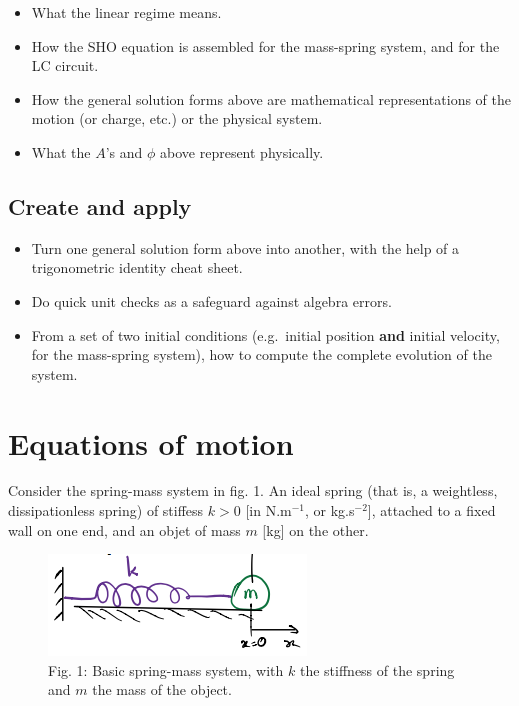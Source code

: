 \documentclass[11pt]{article}
\makeatletter
\def\maxwidth{\ifdim\Gin@nat@width>\linewidth\linewidth
    \else\Gin@nat@width\fi}
\let\Oldincludegraphics\includegraphics
\renewcommand{\includegraphics}[1]{\Oldincludegraphics[width=.8\maxwidth]{#1}}
\providecommand{\tightlist}{%
      \setlength{\itemsep}{0pt}\setlength{\parskip}{0pt}}
\makeatother
\begin{document}
\begin{itemize}
\tightlist
\item
  What the linear regime means.
\item
  How the SHO equation is assembled for the mass-spring system, and for
  the LC circuit.
\item
  How the general solution forms above are mathematical representations
  of the motion (or charge, etc.) or the physical system.
\item
  What the \(A\)'s and \(\phi\) above represent physically.
\end{itemize}

    \hypertarget{create-and-apply}{%
\subsection{Create and apply}\label{create-and-apply}}

\begin{itemize}
\tightlist
\item
  Turn one general solution form above into another, with the help of a
  trigonometric identity cheat sheet.
\item
  Do quick unit checks as a safeguard against algebra errors.
\item
  From a set of two initial conditions (e.g.~initial position
  \textbf{and} initial velocity, for the mass-spring system), how to
  compute the complete evolution of the system.
\end{itemize}

    \hypertarget{equations-of-motion}{%
\section{Equations of motion}\label{equations-of-motion}}

Consider the spring-mass system in fig. 1. An ideal spring (that is, a
weightless, dissipationless spring) of stiffess \(k > 0\) {[}in
N.m\(^{-1}\), or kg.s\(^{-2}\){]}, attached to a fixed wall on one end,
and an objet of mass \(m\) {[}kg{]} on the other.

\begin{figure}
\centering
\includegraphics{SpringMass.png}
\caption{Fig. 1: Basic spring-mass system, with \(k\) the stiffness of
the spring and \(m\) the mass of the object.}
\end{figure}
\end{document}
